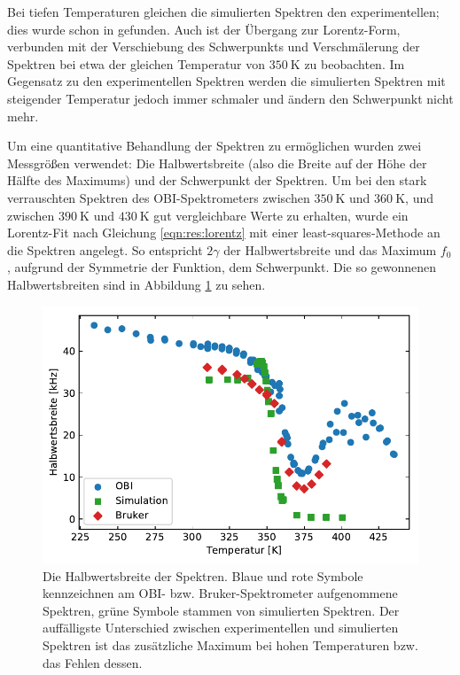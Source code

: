 Bei tiefen Temperaturen gleichen die simulierten Spektren den experimentellen; dies wurde schon in \cite{joachim_master} gefunden. Auch ist der Übergang zur Lorentz-Form, verbunden mit der Verschiebung des Schwerpunkts und Verschmälerung der Spektren bei etwa der gleichen Temperatur von $\SI{350}{\kelvin}$ zu beobachten. Im Gegensatz zu den experimentellen Spektren werden die simulierten Spektren mit steigender Temperatur jedoch immer schmaler und ändern den Schwerpunkt nicht mehr.


Um eine quantitative Behandlung der Spektren zu ermöglichen wurden zwei Messgrößen verwendet: Die Halbwertsbreite (also die Breite auf der Höhe der Hälfte des Maximums) und der Schwerpunkt der Spektren. Um bei den stark verrauschten Spektren des OBI-Spektrometers zwischen $\SI{350}{\kelvin}$ und $\SI{360}{\kelvin}$, und zwischen $\SI{390}{\kelvin}$ und $\SI{430}{\kelvin}$ gut vergleichbare Werte zu erhalten, wurde ein Lorentz-Fit nach Gleichung \eqref{eqn:res:lorentz} mit einer least-squares-Methode an die Spektren angelegt. So entspricht $2 \gamma$ der Halbwertsbreite und das Maximum $f_0$, aufgrund der Symmetrie der Funktion, dem Schwerpunkt. Die so gewonnenen Halbwertsbreiten sind in Abbildung \ref{fig:res:spek_fwhm} zu sehen.
\begin{figure}
	\begin{center}
		\includegraphics[width=.9\textwidth]{graphics/plot/fwhm.pdf}
	\end{center}
	\caption{Die Halbwertsbreite der Spektren. Blaue und rote Symbole kennzeichnen am OBI- bzw. Bruker-Spektrometer aufgenommene Spektren, grüne Symbole stammen von simulierten Spektren. Der auffälligste Unterschied zwischen experimentellen und simulierten Spektren ist das zusätzliche Maximum bei hohen Temperaturen bzw. das Fehlen dessen.} \label{fig:res:spek_fwhm}
\end{figure}

